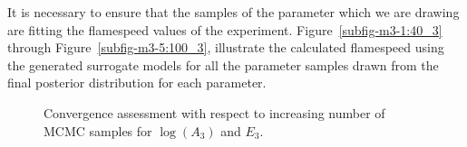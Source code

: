  It is necessary to ensure that the samples of the parameter which we
 are drawing are fitting the flamespeed values of the
 experiment. Figure~\ref{subfig-m3-1:40_3} through
 Figure~\ref{subfig-m3-5:100_3},
 illustrate the calculated flamespeed
 using the generated surrogate models for all the
 parameter samples drawn from the final posterior distribution for
 each parameter.





 \begin{figure}[H]
   \centering
    \caption{Convergence assessment with respect to increasing
              number of MCMC samples for $\log(A_3)$ and $E_3$.}
\end{figure}

